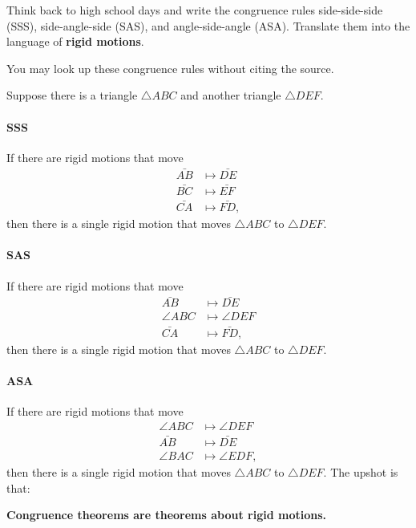 \documentclass[instructornotes]{ximera}
\begin{document}
\begin{problem}
Think back to high school days and write the congruence rules side-side-side (SSS),
side-angle-side (SAS), and angle-side-angle (ASA).  Translate them into the language of \textbf{rigid motions}.

You may look up these congruence rules without citing the source. 

\begin{freeResponse}
Suppose there is a triangle $\triangle ABC$ and another triangle
$\triangle DEF$. 

\paragraph{SSS}
If there are rigid motions that move
\begin{align*}
\bar{AB} &\mapsto \bar{DE}\\
\bar{BC} &\mapsto \bar{EF}\\
\bar{CA} &\mapsto \bar{FD},
\end{align*}
then there is a single rigid motion that moves $\triangle ABC$ to $\triangle DEF$.
\paragraph{SAS}
If there are rigid motions that move
\begin{align*}
\bar{AB} &\mapsto \bar{DE}\\
\angle{ABC} &\mapsto \angle{DEF}\\
\bar{CA} &\mapsto \bar{FD},
\end{align*}
then there is a single rigid motion that moves $\triangle ABC$ to $\triangle DEF$.
\paragraph*{ASA}
If there are rigid motions that move
\begin{align*}
\angle{ABC} &\mapsto \angle{DEF}\\
\bar{AB} &\mapsto \bar{DE}\\
\angle{BAC} &\mapsto \angle{EDF},
\end{align*}
then there is a single rigid motion that moves $\triangle ABC$ to $\triangle DEF$.
The upshot is that:
\begin{center}
\textbf{Congruence theorems are theorems about rigid motions.}
\end{center}
\end{freeResponse}

\end{problem}
\end{document}
